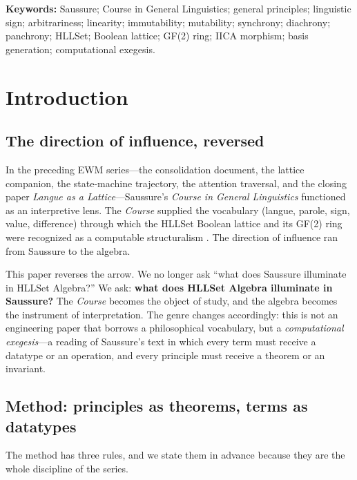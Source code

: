 \documentclass[11pt,a4paper]{article}
\theoremstyle{remark}
\begin{document}
\noindent\textbf{Keywords:} Saussure; Course in General Linguistics; general
principles; linguistic sign; arbitrariness; linearity; immutability;
mutability; synchrony; diachrony; panchrony; HLLSet; Boolean lattice; GF(2)
ring; IICA morphism; basis generation; computational exegesis.

\section{Introduction}
\label{sec:intro}

\subsection{The direction of influence, reversed}

In the preceding EWM series---the consolidation document, the lattice
companion, the state-machine trajectory, the attention traversal, and the
closing paper \textit{Langue as a Lattice}---Saussure's \textit{Course in
General Linguistics} \cite{saussure1916} functioned as an interpretive lens.
The \textit{Course} supplied the vocabulary (langue, parole, sign, value,
difference) through which the HLLSet Boolean lattice and its GF(2) ring were
recognized as a computable structuralism \cite{ewm2026,companion2026,state2026,attention2026,langue2026}.
The direction of influence ran from Saussure to the algebra.

This paper reverses the arrow. We no longer ask ``what does Saussure illuminate
in HLLSet Algebra?'' We ask: \textbf{what does HLLSet Algebra illuminate in
Saussure?} The \textit{Course} becomes the object of study, and the algebra
becomes the instrument of interpretation. The genre changes accordingly: this
is not an engineering paper that borrows a philosophical vocabulary, but a
\emph{computational exegesis}---a reading of Saussure's text in which every
term must receive a datatype or an operation, and every principle must receive
a theorem or an invariant.

\subsection{Method: principles as theorems, terms as datatypes}

The method has three rules, and we state them in advance because they are the
whole discipline of the series.
\end{document}
